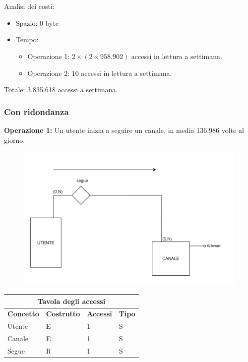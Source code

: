 \\ \\Analisi dei costi:
\begin{itemize}
    \item Spazio: 0 byte
    \item Tempo:
    \begin{itemize}
        \item Operazione 1: $2 \times (2 \times 958.902)$ accessi in lettura a settimana.
        \item Operazione 2: $10$ accessi in lettura a settimana.
    \end{itemize}
\end{itemize}
Totale: 3.835.618 accessi a settimana.



\newpage
\subsubsection*{Con ridondanza} 
\textbf{Operazione 1:} Un utente inizia a seguire un canale, in media 136.986 volte al giorno.
\begin{figure}[h]
    \centering
    \includegraphics[scale = 0.5]{img/ridondanza2.png}
\end{figure}
\begin{center}
\begin{tabular}{|p{3cm}|p{3cm}|p{3cm}|p{3cm}|}
\hline
\multicolumn{4}{|c|}{\textbf{Tavola degli accessi}}\\
\hline
 \multicolumn{1}{|c|}{\textbf{Concetto}} 
 & \multicolumn{1}{|c|}{\textbf{Costrutto}}
 & \multicolumn{1}{|c|}{\textbf{Accessi}}
 & \multicolumn{1}{|c|}{\textbf{Tipo}}\\
  \hline
  Utente & E & 1 & S\\
  \hline
  Canale & E & 1 & S\\
 \hline
  Segue & R & 1 & S\\
 \hline
\end{tabular}
\end{center}


